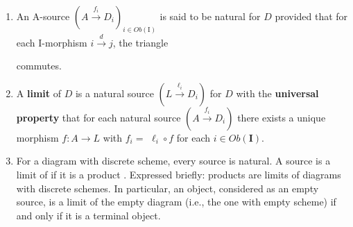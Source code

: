 \documentclass{book}
\begin{document}
\begin{enumerate}
    \item An A-source $\left(A \xrightarrow{f_i} D_i\right)_{i \in O b(\mathrm{I})}$ is said to be natural for $D$ provided that for each I-morphism $i \xrightarrow{d} j$, the triangle 
 commutes.
    \item A \textbf{limit} of $D$ is a natural source $\left(L \xrightarrow{\ell_i} D_i\right)$ for $D$ with the \textbf{universal property} that for each natural source $\left(A \xrightarrow{f_i} D_i\right)$ there exists a unique morphism $f: A \rightarrow L$ with $f_i=$ $\ell_i \circ f$ for each $i \in O b(\mathbf{I})$.

    \item For a diagram with discrete scheme, every source is natural. A source is a limit of if it is a product . Expressed briefly: products are limits of diagrams with discrete schemes. In particular, an object, considered as an empty source, is a limit of the empty diagram (i.e., the one with empty scheme) if and only if it is a terminal object.


\end{enumerate}
\end{document}
